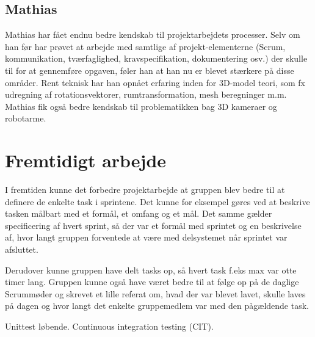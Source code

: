 \subsection{Mathias}
Mathias har fået endnu bedre kendskab til projektarbejdets processer. Selv om han før har prøvet at arbejde med samtlige af projekt-elementerne (Scrum, kommunikation, tværfaglighed, kravspecifikation, dokumentering osv.) der skulle til for at gennemføre opgaven, føler han at han nu er blevet stærkere på disse områder. Rent teknisk har han opnået erfaring inden for 3D-model teori, som fx udregning af rotationsvektorer, rumtransformation, mesh beregninger m.m. Mathias fik også bedre kendskab til problematikken bag 3D kameraer og robotarme.

\section{Fremtidigt arbejde}
I fremtiden kunne det forbedre projektarbejde at gruppen blev bedre til at definere de enkelte task i sprintene. Det kunne for eksempel gøres ved at beskrive tasken målbart med et formål, et omfang og et mål. Det samme gælder specificering af hvert sprint, så der var et formål med sprintet og en beskrivelse af, hvor langt gruppen forventede at være med delsystemet når sprintet var afsluttet.

Derudover kunne gruppen have delt tasks op, så hvert task f.eks max var otte timer lang. Gruppen kunne også have været bedre til at følge op på de daglige Scrummøder og skrevet et lille referat om, hvad der var blevet lavet, skulle laves på dagen og hvor langt det enkelte gruppemedlem var med den pågældende task.

Unittest løbende. Continuous integration testing (CIT). 